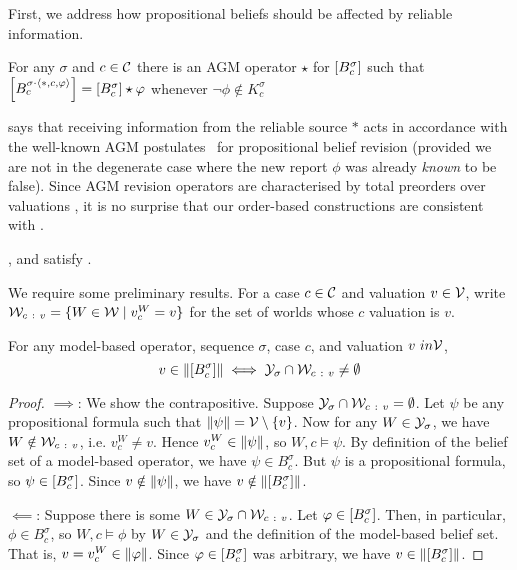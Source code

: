 First, we address how propositional beliefs should be affected by reliable
information.

\begin{axiom}[\agm{}]
    For any $\sigma$ and $c \in \mathcal{C}$ there is an AGM operator $\star$
    for $\left[{B^\sigma_c}\right]$ such that $\left[{B^{\sigma \cdot
    \langle {\ast, c, \varphi} \rangle}_c}\right] = \left[{B^\sigma_c}\right] \star \varphi$ whenever
    $\neg\phi \notin K^\sigma_c$
\end{axiom}

\agm{} says that receiving information from the reliable source $\ast$ acts in
accordance with the well-known AGM postulates~\cite{alchourron1985logic} for propositional belief
revision (provided we are not in the degenerate case where the new report
$\phi$ was already \emph{known} to be false). Since AGM revision operators are
characterised by total preorders over valuations
\cite{grove1988two,katsuno_1991}, it is no surprise that our order-based
constructions are consistent with \agm{}.

\begin{proposition}
    \label{kr_prop_examples_satisfy_agm}
    \varbasedcond{}, \partbasedcond{} and \scorebasedop{}
    satisfy \agm{}.
\end{proposition}

We require some preliminary results. For a case $c \in \mathcal{C}$ and valuation $v \in
\mathcal{V}$, write $\mathcal{W}_{c\ :\ v} = \{W \in \mathcal{W} \mid v^W_c = v\}$ for the set of
worlds whose $c$ valuation is $v$.

\begin{lemma}
    \label{kr_lemma_model_based_models_of_proppart}
    For any model-based operator, sequence $\sigma$, case $c$, and valuation
    $v\ in \mathcal{V}$,
    \[
        v \in \|{\left[{B^\sigma_c}\right]}\|
        \iff
        \mathcal{Y}_\sigma \cap \mathcal{W}_{c\ :\  v} \ne \emptyset
    \]
\end{lemma}

\begin{proof}
    $\implies$: We show the contrapositive. Suppose $\mathcal{Y}_\sigma \cap \mathcal{W}_{c\
    :\ v} = \emptyset$. Let $\psi$ be any propositional formula such that
    $\|{\psi}\| = \mathcal{V} \setminus \{v\}$. Now for any $W \in \mathcal{Y}_\sigma$,
    we have $W \notin \mathcal{W}_{c\ :\  v}$, i.e. $v^W_c \ne v$. Hence $v^W_c \in
    \|{\psi}\|$, so $W, c \models \psi$. By definition of the belief set
    of a model-based operator, we have $\psi \in B^\sigma_c$. But $\psi$ is a
    propositional formula, so $\psi \in \left[{B^\sigma_c}\right]$. Since $v \notin
    \|{\psi}\|$, we have $v \notin \|{\left[{B^\sigma_c}\right]}\|$.

    $\impliedby$: Suppose there is some $W \in \mathcal{Y}_\sigma \cap \mathcal{W}_{c\ :\
    v}$. Let $\varphi \in \left[{B^\sigma_c}\right]$. Then, in particular, $\phi \in
    B^\sigma_c$, so $W, c \models \phi$ by $W \in \mathcal{Y}_\sigma$ and the definition
    of the model-based belief set. That is, $v = v^W_c \in \|{\varphi}\|$.
    Since $\varphi \in \left[{B^\sigma_c}\right]$ was arbitrary, we have $v \in
    \|{\left[{B^\sigma_c}\right]}\|$.
\end{proof}

